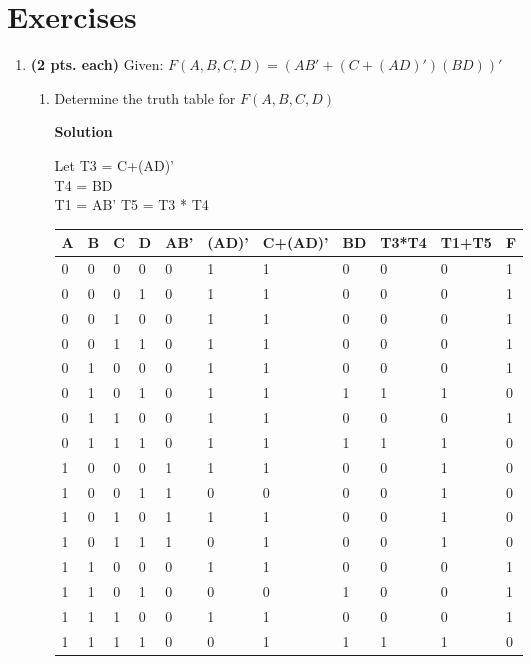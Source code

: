 \section{Exercises}
\label{section:representationsExercises}
\graphicspath{ {./chapter02/FigHw} }

\begin{enumerate}
\item \textbf{(2 pts. each)} Given: $F(A,B,C,D) = (AB' + (C+(AD)')(BD))'$

\begin{enumerate}
	\item Determine the truth table for $F(A,B,C,D)$

\begin{onlysolution}  \textbf{Solution} \itshape

Let T3 = C+(AD)'\\
T4 = BD\\
T1 = AB'
T5 = T3 * T4\\

\begin{tabular}{l|l|l|l|l|l|l|l|l|l|l} 
 A &  B &  C &  D & AB' & (AD)' & C+(AD)' & BD & T3*T4 & T1+T5  &  F \\ \hline
 0 &  0 &  0 &  0 &  0  &  1    &  1      &  0 & 0     &  0     &  1  \\ \hline
 0 &  0 &  0 &  1 &  0 &  1 &  1 &  0 & 0 &  0 &  1  \\ \hline
 0 &  0 &  1 &  0 &  0 &  1 &  1 &  0 & 0 &  0 &  1  \\ \hline
 0 &  0 &  1 &  1 &  0 &  1 &  1 &  0 & 0 &  0 &  1  \\ \hline
 0 &  1 &  0 &  0 &  0 &  1 &  1 &  0 & 0 &  0 &  1  \\ \hline
 0 &  1 &  0 &  1 &  0 &  1 &  1 &  1 & 1 &  1 &  0  \\ \hline
 0 &  1 &  1 &  0 &  0 &  1 &  1 &  0 & 0 &  0 &  1  \\ \hline
 0 &  1 &  1 &  1 &  0 &  1 &  1 &  1 & 1 &  1 &  0  \\ \hline
 1 &  0 &  0 &  0 &  1 &  1 &  1 &  0 & 0 &  1 &  0  \\ \hline
 1 &  0 &  0 &  1 &  1 &  0 &  0 &  0 & 0 &  1 &  0  \\ \hline
 1 &  0 &  1 &  0 &  1 &  1 &  1 &  0 & 0 &  1 &  0  \\ \hline
 1 &  0 &  1 &  1 &  1 &  0 &  1 &  0 & 0 &  1 &  0  \\ \hline
 1 &  1 &  0 &  0 &  0 &  1 &  1 &  0 & 0 &  0 &  1  \\ \hline
 1 &  1 &  0 &  1 &  0 &  0 &  0 &  1 & 0 &  0 &  1  \\ \hline
 1 &  1 &  1 &  0 &  0 &  1 &  1 &  0 & 0 &  0 &  1  \\ \hline
 1 &  1 &  1 &  1 &  0 &  0 &  1 &  1 & 1 &  1 &  0  \\  
\end{tabular} 
\end{onlysolution}


\end{enumerate}
\end{enumerate}
